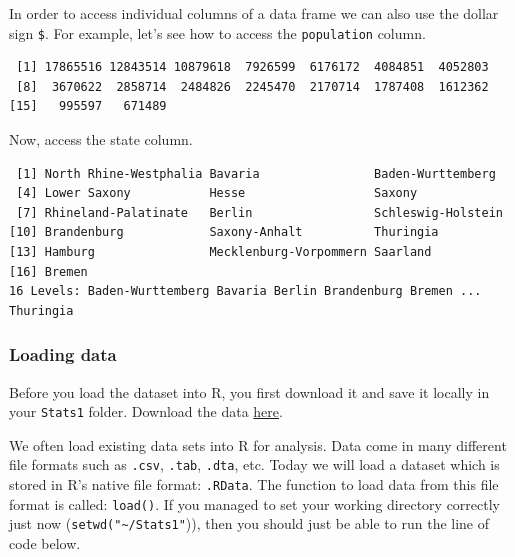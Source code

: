 \documentclass[]{article}
\newenvironment{Shaded}{\begin{snugshade}}{\end{snugshade}}
\newcommand{\OperatorTok}[1]{\textcolor[rgb]{0.81,0.36,0.00}{\textbf{#1}}}
\newcommand{\NormalTok}[1]{#1}
\theoremstyle{definition}
\theoremstyle{definition}
\theoremstyle{definition}
\theoremstyle{remark}
\begin{document}
In order to access individual columns of a data frame we can also use
the dollar sign \texttt{\$}. For example, let's see how to access the
\texttt{population} column.

\begin{Shaded}
\end{Shaded}

\begin{verbatim}
 [1] 17865516 12843514 10879618  7926599  6176172  4084851  4052803
 [8]  3670622  2858714  2484826  2245470  2170714  1787408  1612362
[15]   995597   671489
\end{verbatim}

Now, access the state column.

\begin{Shaded}
\end{Shaded}

\begin{verbatim}
 [1] North Rhine-Westphalia Bavaria                Baden-Wurttemberg     
 [4] Lower Saxony           Hesse                  Saxony                
 [7] Rhineland-Palatinate   Berlin                 Schleswig-Holstein    
[10] Brandenburg            Saxony-Anhalt          Thuringia             
[13] Hamburg                Mecklenburg-Vorpommern Saarland              
[16] Bremen                
16 Levels: Baden-Wurttemberg Bavaria Berlin Brandenburg Bremen ... Thuringia
\end{verbatim}

\subsubsection{Loading data}\label{loading-data}

Before you load the dataset into R, you first download it and save it
locally in your \texttt{Stats1} folder. Download the data
\href{http://philippbroniecki.github.io/ML2017.io/data/BSAS_manip.RData}{here}.

We often load existing data sets into R for analysis. Data come in many
different file formats such as \texttt{.csv}, \texttt{.tab},
\texttt{.dta}, etc. Today we will load a dataset which is stored in R's
native file format: \texttt{.RData}. The function to load data from this
file format is called: \texttt{load()}. If you managed to set your
working directory correctly just now
(\texttt{setwd("\textasciitilde{}/Stats1"})), then you should just be
able to run the line of code below.
\end{document}
